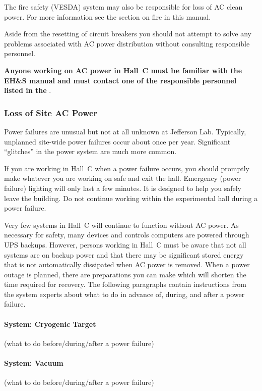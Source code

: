 {The fire safety (VESDA) system may also be responsible for loss of AC
clean power. For more information see the section on fire in this
manual.

Aside from the resetting of circuit breakers you should not attempt
to solve any problems associated with AC power distribution without
consulting responsible personnel.

{\bf Anyone working on AC power in Hall~C must be familiar with
the EH\&S manual and must contact one of the responsible personnel listed
in the }.

\subsubsection{Loss of Site AC Power}

Power failures are unusual but not at all unknown at Jefferson Lab. Typically,
unplanned site-wide power failures occur about once per year. Significant
``glitches'' in the power system are much more common.

If you are working in Hall~C when a power failure occurs, you should
promptly make whatever you are working on safe and exit the hall. Emergency
(power failure) lighting will only last a few minutes. It is designed to
help you safely leave the building. Do not continue working within the
experimental hall during a power failure.

Very few systems in Hall~C will continue to function without AC power. As
necessary for safety, many devices and controls computers are powered through
UPS backups. However, persons working in Hall~C must be aware that not all
systems are on backup power and that there may be significant stored energy
that is not automatically dissipated when AC power is removed. When a 
power outage is planned, there are preparations you can make which will
shorten the time required for recovery. The following paragraphs contain
instructions from the system experts about what to do in advance of, during,
and after a power failure.

\paragraph {System: Cryogenic Target}
(what to do before/during/after a power failure)

\paragraph {System: Vacuum}
(what to do before/during/after a power failure)

}
